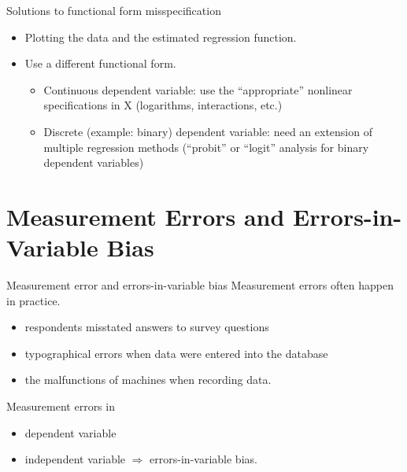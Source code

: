 \documentclass[presentation,10pt]{beamer}
\begin{document}
\begin{frame}[label={sec:orgda2ac81}]{Solutions to functional form misspecification}
\begin{itemize}
\item Plotting the data and the estimated regression function.
\end{itemize}

\vspace{0.1cm}

\begin{itemize}
\item Use a different functional form.
\begin{itemize}
\item Continuous dependent variable:  use the “appropriate” nonlinear
specifications in X (logarithms, interactions, etc.)
\item Discrete (example: binary) dependent variable:  need an extension of
multiple regression methods (“probit” or “logit” analysis for binary
dependent variables)
\end{itemize}
\end{itemize}
\end{frame}

\section{Measurement Errors and Errors-in-Variable Bias}
\label{sec:org4783f2a}

\begin{frame}[label={sec:org284141e}]{Measurement error and errors-in-variable bias}
Measurement errors often happen in practice. 
\begin{itemize}
\item respondents misstated answers to survey questions
\item typographical errors when data were entered into the database
\item the malfunctions of machines when recording data.
\end{itemize}

\vspace{0.1cm}

Measurement errors in
\begin{itemize}
\item dependent variable
\item independent variable \(\Rightarrow\) \alert{errors-in-variable bias}.
\end{itemize}
\end{frame}
\end{document}
